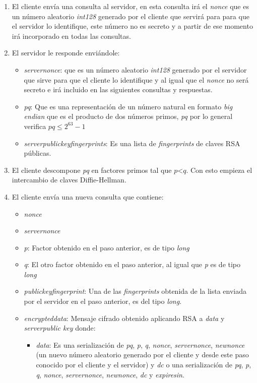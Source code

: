 \begin{enumerate}
	\item El cliente envía una consulta al servidor, en esta consulta irá el \emph{nonce} que es un número aleatorio \emph{int128} generado por el cliente que servirá para para que el servidor lo identifique, este número no es secreto y a partir de ese momento irá incorporado en todas las consultas. 
	
	\item El servidor le responde enviándole: 
	\begin{itemize}
		\item \emph{server\textunderscore nonce}: que es un número aleatorio \emph{int128} generado por el servidor que sirve para que el cliente lo identifique y al igual que el \emph{nonce} no será secreto e irá incluido en las siguientes consultas y respuestas. 
		\item \emph{pq}: Que es una representación de un número natural en formato \emph{big endian} que es el producto de dos números primos, \emph{pq} por lo general verifica $pq \leq 2^{63}-1$
		\item \emph{server\textunderscore public\textunderscore key\textunderscore fingerprints}: Es una lista de \emph{fingerprints} de claves RSA públicas.
	\end{itemize}

	\item El cliente descompone \emph{pq} en factores primos tal que $p$\textless$q$. Con esto empieza el intercambio de claves Diffie-Hellman.

	\item El cliente envía una nueva consulta que contiene:
	\begin{itemize}
		\item \emph{nonce}
		\item \emph{server\textunderscore nonce}
		\item \emph{p}: Factor obtenido en el paso anterior, es de tipo \emph{long}
		\item \emph{q}: El otro factor obtenido en el paso anterior, al igual que \emph{p} es de tipo \emph{long}
		\item \emph{public\textunderscore key\textunderscore fingerprint}: Una de las \emph{fingerprints} obtenida de la lista enviada por el servidor en el paso anterior, es del tipo \emph{long}.
		\item \emph{encrypted\textunderscore data}: Mensaje cifrado obtenido aplicando RSA a \emph{data} y \emph{server\textunderscore public \textunderscore key} donde:
		\begin{itemize}
			\item \emph{data}: Es una serialización de \emph{pq}, \emph{p}, \emph{q}, \emph{nonce}, \emph{server\textunderscore nonce}, \emph{new\textunderscore nonce} (un nuevo número aleatorio generado por el cliente y desde este paso conocido por el cliente y el servidor) y \emph{dc} o una serialización de \emph{pq}, \emph{p}, \emph{q}, \emph{nonce}, \emph{server\textunderscore nonce}, \emph{new\textunderscore nonce}, \emph{dc} y \emph{expires\textunderscore in}.


\end{itemize}
\end{itemize}
\end{enumerate}
